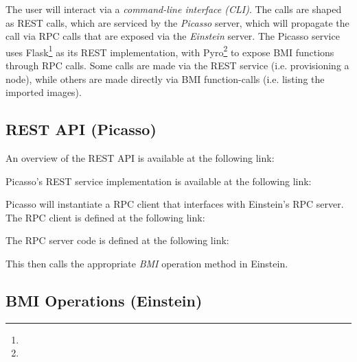 The user will interact via a \emph{command-line interface (CLI)}.  The calls are shaped as REST calls, which are serviced by the \emph{Picasso} server, which will propagate the call via RPC calls that are exposed via the \emph{Einstein} server.  The Picasso service uses Flask\footnote{}  as its REST implementation, with Pyro\footnote{ } to expose BMI functions through RPC calls.  Some calls are made via the REST service (i.e. provisioning a node), while others are made directly via BMI function-calls (i.e. listing the imported images). %


\subsection{REST API (Picasso)}

An overview of the REST API is available at the following link:

\begin{center}
\end{center}


Picasso's REST service implementation is available at the following link:

\begin{center}
\end{center}

Picasso will instantiate a RPC client that interfaces with Einstein's RPC server.  The RPC client is defined at the following link:

\begin{center}
\end{center}


The RPC server code is defined at the following link:

\begin{center}
\end{center}

This then calls the appropriate \emph{BMI} operation method in Einstein.




\subsection{BMI Operations (Einstein)}

